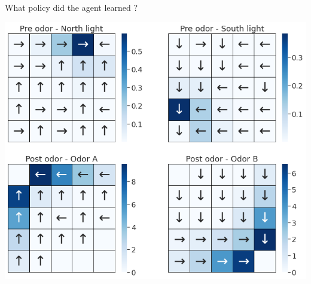 \documentclass[bigger]{beamer}
\begin{document}
\begin{frame}[label={sec:org439d520}]{What policy did the agent learned ?}
\begin{center}
\includegraphics[height=0.9\textheight]{img/policy-allo-joint-repr.png}
\end{center}
\end{frame}
\end{document}
